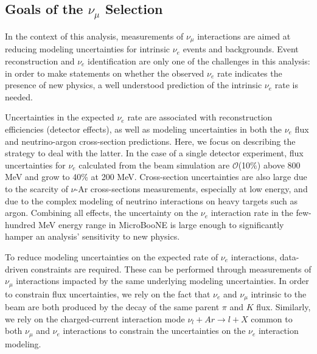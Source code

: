 \subsection{Goals of the $\nu_{\mu}$ Selection}
\label{ssec:goalsofnumusel}

\par In the context of this analysis, measurements of $\nu_{\mu}$ interactions are aimed at reducing modeling uncertainties for intrinsic $\nu_e$ events and backgrounds. Event reconstruction and $\nu_e$ identification are only one of the challenges in this analysis:  in order to make statements on whether the observed $\nu_e$ rate indicates the presence of new physics, a well understood prediction of the intrinsic $\nu_e$ rate is needed. 

\par Uncertainties in the expected $\nu_e$ rate are associated with reconstruction efficiencies (detector effects), as well as modeling uncertainties in both the $\nu_e$ flux  and neutrino-argon cross-section predictions. Here, we focus on describing the strategy to deal with the latter. In the case of a single detector experiment,
flux uncertainties for $\nu_e$ calculated from the beam simulation are $\mathcal{O}$(10\%) above 800 MeV and grow to 40\% at 200 MeV. Cross-section uncertainties are also large due to the scarcity of $\nu$-Ar cross-sections measurements, especially at low energy, and due to the complex modeling of neutrino interactions on heavy targets such as argon. Combining all effects, the uncertainty on the $\nu_e$ interaction rate in the few-hundred MeV energy range in MicroBooNE is large enough to significantly hamper an analysis' sensitivity to new physics.
\par To reduce modeling uncertainties on the expected rate of $\nu_e$ interactions, data-driven constraints are required. These can be performed through measurements of $\nu_{\mu}$ interactions impacted by the same underlying modeling uncertainties. In order to constrain flux uncertainties, we rely on the fact that $\nu_e$ and $\nu_{\mu}$ intrinsic to the beam are both produced by the decay of the same parent $\pi$ and $K$ flux. Similarly, we rely on the charged-current interaction mode $\nu_{l} + Ar \rightarrow l + X$ common to both $\nu_{\mu}$ and $\nu_e$ interactions to constrain the uncertainties on the $\nu_e$ interaction modeling.


